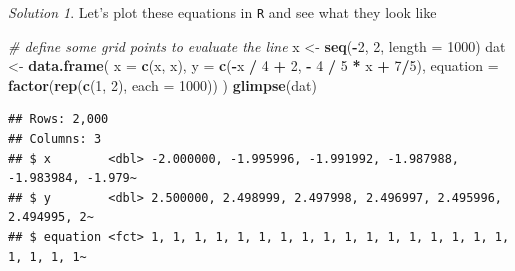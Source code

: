 \documentclass[
]{book}
\newenvironment{Shaded}{\begin{snugshade}}{\end{snugshade}}
\newcommand{\CommentTok}[1]{\textcolor[rgb]{0.56,0.35,0.01}{\textit{#1}}}
\newcommand{\DataTypeTok}[1]{\textcolor[rgb]{0.13,0.29,0.53}{#1}}
\newcommand{\DecValTok}[1]{\textcolor[rgb]{0.00,0.00,0.81}{#1}}
\newcommand{\FloatTok}[1]{\textcolor[rgb]{0.00,0.00,0.81}{#1}}
\newcommand{\KeywordTok}[1]{\textcolor[rgb]{0.13,0.29,0.53}{\textbf{#1}}}
\newcommand{\NormalTok}[1]{#1}
\newcommand{\OperatorTok}[1]{\textcolor[rgb]{0.81,0.36,0.00}{\textbf{#1}}}
\newcommand{\StringTok}[1]{\textcolor[rgb]{0.31,0.60,0.02}{#1}}
\theoremstyle{definition}
\theoremstyle{definition}
\theoremstyle{definition}
\theoremstyle{definition}
\theoremstyle{remark}
\newtheorem*{solution}{Solution}
\begin{document}
\begin{solution}
Let's plot these equations in \texttt{R} and see what they look like

\begin{Shaded}
\begin{Highlighting}[]
\CommentTok{# define some grid points to evaluate the line}
\NormalTok{x <-}\StringTok{ }\KeywordTok{seq}\NormalTok{(}\OperatorTok{-}\DecValTok{2}\NormalTok{, }\DecValTok{2}\NormalTok{, }\DataTypeTok{length =} \DecValTok{1000}\NormalTok{)}
\NormalTok{dat <-}\StringTok{ }\KeywordTok{data.frame}\NormalTok{(}
    \DataTypeTok{x =} \KeywordTok{c}\NormalTok{(x, x),}
    \DataTypeTok{y =} \KeywordTok{c}\NormalTok{(}\OperatorTok{-}\NormalTok{x }\OperatorTok{/}\StringTok{ }\DecValTok{4} \OperatorTok{+}\StringTok{ }\DecValTok{2}\NormalTok{, }\OperatorTok{-}\StringTok{ }\DecValTok{4} \OperatorTok{/}\StringTok{ }\DecValTok{5} \OperatorTok{*}\StringTok{ }\NormalTok{x }\OperatorTok{+}\StringTok{ }\DecValTok{7}\OperatorTok{/}\DecValTok{5}\NormalTok{),}
    \DataTypeTok{equation =} \KeywordTok{factor}\NormalTok{(}\KeywordTok{rep}\NormalTok{(}\KeywordTok{c}\NormalTok{(}\DecValTok{1}\NormalTok{, }\DecValTok{2}\NormalTok{), }\DataTypeTok{each =} \DecValTok{1000}\NormalTok{))}
\NormalTok{)}
\KeywordTok{glimpse}\NormalTok{(dat)}
\end{Highlighting}
\end{Shaded}

\begin{verbatim}
## Rows: 2,000
## Columns: 3
## $ x        <dbl> -2.000000, -1.995996, -1.991992, -1.987988, -1.983984, -1.979~
## $ y        <dbl> 2.500000, 2.498999, 2.497998, 2.496997, 2.495996, 2.494995, 2~
## $ equation <fct> 1, 1, 1, 1, 1, 1, 1, 1, 1, 1, 1, 1, 1, 1, 1, 1, 1, 1, 1, 1, 1~
\end{verbatim}

\begin{Shaded}
\end{Shaded}


\end{solution}
\end{document}
